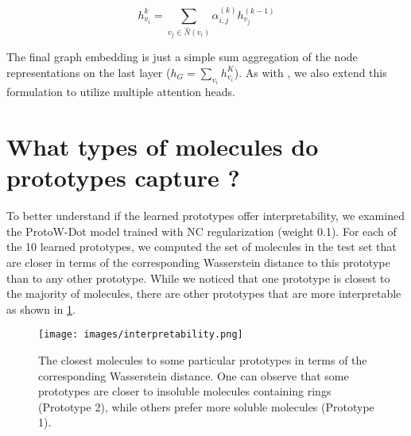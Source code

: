 \documentclass[letterpaper]{article} \usepackage{aaai22}  \usepackage{times}  \usepackage{helvet}  \usepackage{courier}  \usepackage[hyphens]{url}  \usepackage{graphicx} \urlstyle{rm} \def\UrlFont{\rm}  \usepackage{natbib}  \usepackage{caption} \DeclareCaptionStyle{ruled}{labelfont=normalfont,labelsep=colon,strut=off} \frenchspacing  \setlength{\pdfpagewidth}{8.5in}  \setlength{\pdfpageheight}{11in}  \usepackage{algorithm}
\begin{document}
\begin{equation}
    h_{v_i}^{k} = \sum_{v_j \in \hat{N}(v_i)} \alpha^{(k)}_{i,j}h_{v_j}^{(k-1)}
\end{equation}

The final graph embedding is just a simple sum aggregation of the node representations on the last layer ($h_G = \sum_{v_i} h_{v_i}^{K}$). As with \citep{velivckovic2017graph}, we also extend this formulation to utilize multiple attention heads.


\section{What types of molecules do prototypes capture ?} \label{apx:interp}

To better understand if the learned prototypes offer interpretability, we examined the ProtoW-Dot model trained with NC regularization (weight 0.1). For each of the 10 learned prototypes, we computed the set of molecules in the test set that are closer in terms of the corresponding Wasserstein distance to this prototype than to any other prototype. While we noticed that one prototype is closest to the majority of molecules, there are other prototypes that are more interpretable as shown in \cref{fig:interpr}.

\begin{figure}[h]
    \centering
    \texttt{[image: images/interpretability.png]}
    \caption{The closest molecules to some particular prototypes in terms of the corresponding Wasserstein distance. One can observe that some prototypes are closer to insoluble molecules containing rings (Prototype 2), while others prefer more soluble molecules (Prototype 1).  } 
    \label{fig:interpr}
\end{figure}


\end{document}
